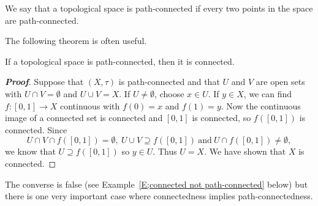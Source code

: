 We say that a topological space is path-connected if every two
points in the space are path-connected.

The following theorem is often useful.


\begin{theorem}\label{T;path-connected to connected}
If a topological space is path-connected, then it is connected.
\end{theorem}
\begin{proof}[\bf Proof]
Suppose that $(X,\tau)$ is path-connected and 
that $U$ and $V$ are
open sets with $U\cap V=\emptyset$ and $U\cup V=X$.
If $U\neq \emptyset$, choose $x\in U$.
If $y\in X$, we
can find $f:[0,1]\rightarrow X$ continuous with
$f(0)=x$ and $f(1)=y$. Now the continuous image of a connected set
is connected and $[0,1]$ is connected, so $f([0,1])$ is connected.
Since
\[U\cap V\cap f([0,1])=\emptyset,
\ U\cup V\supseteq f([0,1])
\ \text{and}\ U\cap f([0,1])\neq\emptyset,\]
we know that $U\supseteq f([0,1])$ so $y\in U$. Thus $U=X$.
We have shown that $X$ is connected.  
\end{proof}

The converse is false (see Example~\ref{E;connected not path-connected}
below) but there is one very important case where connectedness
implies path-connectedness.



